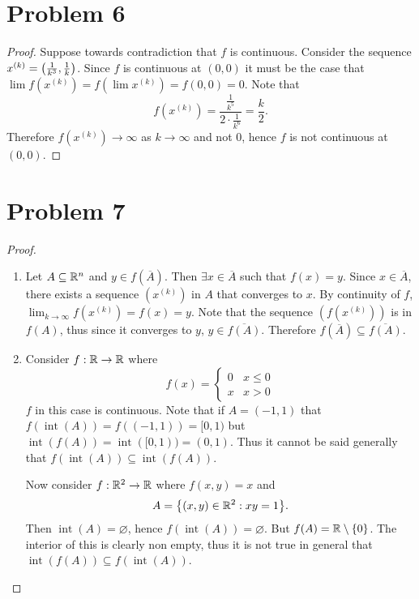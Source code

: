 \documentclass{eeleyes}
\newcommand\conj[1]{\overline{#1}}
\DeclareMathOperator{\interior}{int}
\begin{document}
\section*{Problem 6}
\begin{proof}
    Suppose towards contradiction that $f$ is continuous. Consider the sequence $x^{(k)} = \qty(\frac{1}{k^3}, \frac{1}{k})$. Since $f$ is continuous at $(0,0)$ it must be the case that $\lim f(x^{(k)}) = f(\lim x^{(k)}) = f(0,0) = 0$. Note that
    \[
        f(x^{(k)}) = \frac{\frac{1}{k^5}}{2 \cdot \frac{1}{k^6}} = \frac{k}{2}
    .\]
    Therefore $f(x^{(k)}) \to \infty$ as $k \to \infty$ and not $0$, hence $f$ is not continuous at $(0,0)$.
\end{proof}

\section*{Problem 7}
\begin{proof}
    \begin{enumerate}[label=\roman*)]
        \item Let $A \subseteq \mathbb{R}^n$ and $y \in f(\conj{A})$. Then $\exists x \in \conj{A}$ such that $f(x) = y$. Since $x \in \conj{A}$, there exists a sequence $(x^{(k)})$ in $A$ that converges to $x$. By continuity of $f$, $\lim_{k \to \infty} f(x^{(k)}) = f(x) = y$. Note that the sequence $(f(x^{(k)}))$ is in $f(A)$, thus since it converges to $y$, $y \in \conj{f(A)}$. Therefore $f(\conj{A}) \subseteq \conj{f(A)}$. \hfill \qedsymbol

        \item Consider $f : \mathbb{R} \to \mathbb{R}$ where
        \[
            f(x) = \begin{cases}
                0 & x \leq 0 \\
                x & x > 0
            \end{cases}
        \]
        $f$ in this case is continuous. Note that if $A = (-1, 1)$ that $f(\interior(A)) = f((-1,1)) = [0,1)$ but $\interior(f(A)) = \interior([0,1)) = (0,1)$. Thus it cannot be said generally that $f(\interior(A)) \subseteq \interior(f(A))$. 

        Now consider $f : \mathbb{R}^2 \to \mathbb{R}$ where $f(x,y) = x$ and 
        \[
            A = \qty{(x,y) \in \mathbb{R}^2 : xy = 1}
        .\]
        Then $\interior(A) = \varnothing$, hence $f(\interior(A)) = \varnothing$. But $f(A) = \mathbb{R} \setminus \qty{0}$. The interior of this is clearly non empty, thus it is not true in general that $\interior(f(A)) \subseteq f(\interior(A))$. \qedhere
    \end{enumerate}
\end{proof}
\end{document}
